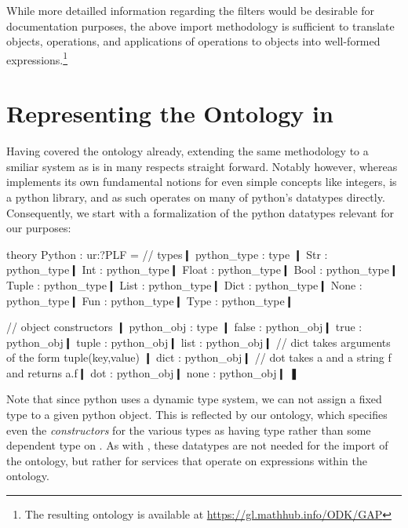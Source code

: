 While more detailled information regarding the filters would be desirable for documentation purposes, the above import methodology is sufficient to translate \GAP objects, operations, and applications of operations to objects into well-formed \ommt expressions.\footnote{The resulting ontology is available at \url{https://gl.mathhub.info/ODK/GAP}}

\section{Representing the \Sage Ontology in \ommt}

Having covered the \GAP ontology already, extending the same methodology to a smiliar system as \Sage is in many respects straight forward. Notably however, whereas \GAP implements its own fundamental notions for even simple concepts like integers, \Sage is a python library, and as such operates on many of python's datatypes directly. Consequently, we start with a formalization of the python datatypes relevant for our purposes:

\begin{mmtcode}[caption= {Python Datatypes in \mmt\protect\footnotemark},label=lst:import:sage:python]
theory Python : ur:?PLF =  
  // types❙
  python_type : type ❙
  Str   : python_type❙
  Int   : python_type❙
  Float : python_type❙
  Bool  : python_type❙
  Tuple : python_type❙
  List  : python_type❙
  Dict  : python_type❙
  None  : python_type❙
  Fun   : python_type❙
  Type  : python_type❙

  // object constructors ❙
  python_obj  : type ❙
  false : python_obj❙
  true  : python_obj❙
  tuple : python_obj❙
  list  : python_obj❙
  // dict takes arguments of the form tuple(key,value) ❙
  dict  : python_obj❙
  // dot takes a and a string f and returns a.f❙
  dot   : python_obj❙
  none  : python_obj❙
❚

\end{mmtcode}

Note that since python uses a dynamic type system, we can not assign a fixed type to a given python object. This is reflected by our ontology, which specifies even the \emph{constructors} for the various types as having type  rather than some dependent type on . As with \GAP, these datatypes are not needed for the import of the ontology, but rather for services that operate on expressions within the ontology.

